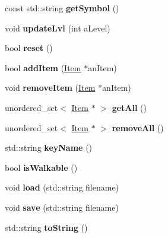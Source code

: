 \begin{DoxyCompactItemize}
\item 
\hypertarget{class_chest_a20463fdfbfc66d13080ba20974b2ff7d}{}\label{class_chest_a20463fdfbfc66d13080ba20974b2ff7d} 
const std\+::string {\bfseries get\+Symbol} ()
\item 
\hypertarget{class_chest_aa6c95831a0e55155c917323f7bd24249}{}\label{class_chest_aa6c95831a0e55155c917323f7bd24249} 
void {\bfseries update\+Lvl} (int a\+Level)
\item 
\hypertarget{class_chest_ac14bf4adcd35db79f8cd018aaffb2bab}{}\label{class_chest_ac14bf4adcd35db79f8cd018aaffb2bab} 
bool {\bfseries reset} ()
\item 
\hypertarget{class_chest_a6bed6abc28230857fae972d1502e4439}{}\label{class_chest_a6bed6abc28230857fae972d1502e4439} 
bool {\bfseries add\+Item} (\hyperlink{class_item}{Item} $\ast$an\+Item)
\item 
\hypertarget{class_chest_a72987b964c8616fdc74344a9d9f8d095}{}\label{class_chest_a72987b964c8616fdc74344a9d9f8d095} 
void {\bfseries remove\+Item} (\hyperlink{class_item}{Item} $\ast$an\+Item)
\item 
\hypertarget{class_chest_ae4663c7ab039a1a13a39c1c9ab7e3ac9}{}\label{class_chest_ae4663c7ab039a1a13a39c1c9ab7e3ac9} 
unordered\+\_\+set$<$ \hyperlink{class_item}{Item} $\ast$ $>$ {\bfseries get\+All} ()
\item 
\hypertarget{class_chest_a0a3e28a480606f1a650a34043992f880}{}\label{class_chest_a0a3e28a480606f1a650a34043992f880} 
unordered\+\_\+set$<$ \hyperlink{class_item}{Item} $\ast$ $>$ {\bfseries remove\+All} ()
\item 
\hypertarget{class_chest_a0a10f9b5a9ec421f6f3756b39edc92b9}{}\label{class_chest_a0a10f9b5a9ec421f6f3756b39edc92b9} 
std\+::string {\bfseries key\+Name} ()
\item 
\hypertarget{class_chest_a263bdda01679de8aa3fef71036d33b2a}{}\label{class_chest_a263bdda01679de8aa3fef71036d33b2a} 
bool {\bfseries is\+Walkable} ()
\item 
\hypertarget{class_chest_a956e975682338b63e5f51b975c9707d4}{}\label{class_chest_a956e975682338b63e5f51b975c9707d4} 
void {\bfseries load} (std\+::string filename)
\item 
\hypertarget{class_chest_a0a0077543c751d68acd1130845561559}{}\label{class_chest_a0a0077543c751d68acd1130845561559} 
void {\bfseries save} (std\+::string filename)
\item 
\hypertarget{class_chest_a54b773b175e8961c0dca87409a96507b}{}\label{class_chest_a54b773b175e8961c0dca87409a96507b} 
std\+::string {\bfseries to\+String} ()
\end{DoxyCompactItemize}
